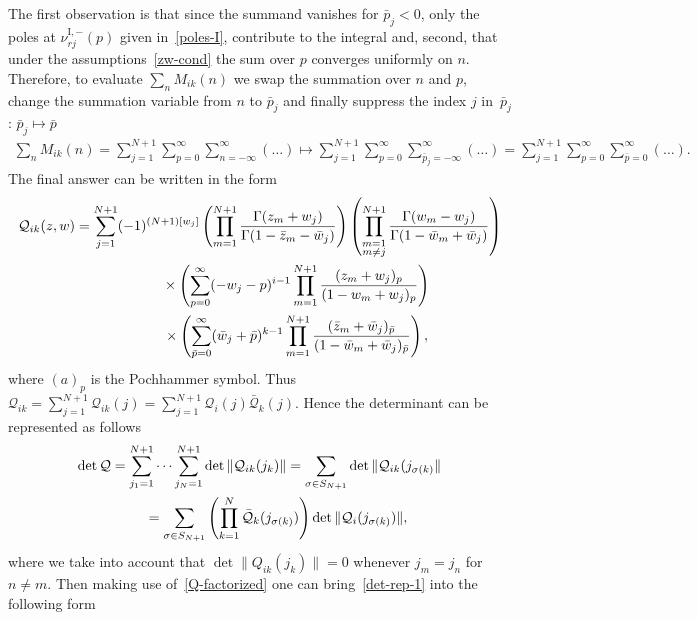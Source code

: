 The first observation is that since the summand vanishes for $\bar p_j < 0$, only the poles at
$\nu^{\mathrm{I},-}_{rj}(p)$ given in~\eqref{poles-I}, contribute to the integral and, second, that under the
assumptions~\eqref{zw-cond} the sum over $p$ converges uniformly on $n$. Therefore, to evaluate $\sum_n M_{ik}(n)$ we
swap the summation over $n$ and $p$, change the summation variable from $n$ to $\bar p_j$ and finally suppress the
index $j$ in~$\bar p_j$: $\bar p_j\mapsto \bar p$
\begin{gather*}
\sum_n M_{ik}(n)=\sum_{j=1}^{N+1}\sum_{p= 0}^{\infty} \sum_{n=-\infty}^{\infty}( \ldots )
\mapsto \sum_{j=1}^{N+1}\sum_{p= 0}^{\infty}
\sum_{\bar p_j=-\infty}^{\infty}( \ldots ) =\sum_{j=1}^{N+1}\sum_{p= 0}^{\infty}
\sum_{\bar p =0}^{\infty}( \ldots ).
\end{gather*}
The final answer can be written in the form
\begin{gather}
\mathcal Q_{ik}(z,w) =\sum_{j=1}^{N+1} (-1)^{(N+1)[w_j]}
\left(\prod_{m=1}^{N+1}\frac{\Gamma(z_m+w_{j})}{\Gamma(1-\bar z_m-\bar w_{j})}\right)\left(
\prod_{\substack{m=1\\ m\neq j}}^{ N+1}\frac{ \Gamma(w_m-w_{j})}{\Gamma(1-\bar w_m+\bar w_{j})}\right)\notag\\
\hphantom{\mathcal Q_{ik}(z,w)=}{} \times
\left(\sum_{p=0}^{\infty} (-w_{j}-p)^{i-1}\prod_{m=1}^{N+1}
\frac{(z_m+w_{j})_{p}}{(1-w_m+w_{j})_{p}}\right)\nonumber\\
\hphantom{\mathcal Q_{ik}(z,w)=}{} \times
\left(\sum_{\bar p=0}^{\infty}(\bar w_{j} + \bar p)^{k-1}\prod_{m=1}^{N+1}
\frac{(\bar z_m+\bar w_{j})_{\bar p}}{(1-\bar w_m+\bar w_{j})_{\bar p}}\right) , \label{Q-factorized}
\end{gather}
where $(a)_p$ is the Pochhammer symbol. Thus $\mathcal Q_{ik}=\sum\limits_{j=1}^{N+1} \mathcal Q_{ik}(j)= \sum\limits_{j=1}^{N+1} \mathcal Q_{i}(j)\bar{\mathcal Q}_k(j)$. Hence the determinant can be represented as follows
\begin{gather*}
\det\mathcal Q =\sum_{j_1=1}^{N+1}\cdots \sum_{j_N=1}^{N+1}
\det\|\mathcal Q_{ik}(j_k)\| =\sum_{\sigma\in S_{N+1}}
\det \| \mathcal Q_{ik}(j_{\sigma(k)}\|
\notag\\
\hphantom{\det\mathcal Q}{} =\sum_{\sigma\in S_{N+1}} \left(\prod_{k=1}^N\bar{\mathcal Q}_k(j_{\sigma(k)})\right)
\det\| \mathcal Q_{i}(j_{\sigma(k)})\|,
\end{gather*}
where we take into account that $\det\|Q_{ik}(j_k)\|=0$ whenever $j_{m}=j_n$ for $n\neq m$. Then making use of~\eqref{Q-factorized} one can bring~\eqref{det-rep-1} into the following form
